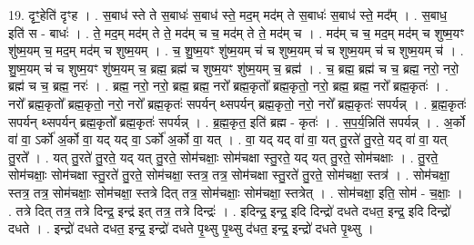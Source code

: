 \documentclass[17pt]{extarticle}
\begin{document}
19. दृꣳ॒॒हेति॑ दृꣳह । . स॒बाध॑ स्ते ते स॒बाधः॑ स॒बाध॑ स्ते॒ मद॒म् मद॑म् ते स॒बाधः॑ स॒बाध॑ स्ते॒ मद᳚म् । . स॒बाध॒ इति॑ स - बाधः॑ । . ते॒ मद॒म् मद॑म् ते ते॒ मद॑म् च च॒ मद॑म् ते ते॒ मद॑म् च । . मद॑म् च च॒ मद॒म् मद॑म् च शुष्म॒यꣳ शु॑ष्म॒यम् च॒ मद॒म् मद॑म् च शुष्म॒यम् । . च॒ शु॒ष्म॒यꣳ शु॑ष्म॒यम् च॑ च शुष्म॒यम् च॑ च शुष्म॒यम् च॑ च शुष्म॒यम् च॑ । . शु॒ष्म॒यम् च॑ च शुष्म॒यꣳ शु॑ष्म॒यम् च॒ ब्रह्म॒ ब्रह्म॑ च शुष्म॒यꣳ शु॑ष्म॒यम् च॒ ब्रह्म॑ । . च॒ ब्रह्म॒ ब्रह्म॑ च च॒ ब्रह्म॒ नरो॒ नरो॒ ब्रह्म॑ च च॒ ब्रह्म॒ नरः॑ । . ब्रह्म॒ नरो॒ नरो॒ ब्रह्म॒ ब्रह्म॒ नरो᳚ ब्रह्म॒कृतो᳚ ब्रह्म॒कृतो॒ नरो॒ ब्रह्म॒ ब्रह्म॒ नरो᳚ ब्रह्म॒कृतः॑ । . नरो᳚ ब्रह्म॒कृतो᳚ ब्रह्म॒कृतो॒ नरो॒ नरो᳚ ब्रह्म॒कृतः॑ सपर्यन् थ्सपर्यन् ब्रह्म॒कृतो॒ नरो॒ नरो᳚ ब्रह्म॒कृतः॑ सपर्यन्न् । . ब्र॒ह्म॒कृतः॑ सपर्यन् थ्सपर्यन् ब्रह्म॒कृतो᳚ ब्रह्म॒कृतः॑ सपर्यन्न् । . ब्र॒ह्म॒कृत॒ इति॑ ब्रह्म - कृतः॑ । . स॒प॒र्य॒न्निति॑ सपर्यन्न् । . अ॒र्को वा॑ वा॒ ऽर्को॑ अ॒र्को वा॒ यद् यद् वा॒ ऽर्को॑ अ॒र्को वा॒ यत् । . वा॒ यद् यद् वा॑ वा॒ यत् तु॒रते॑ तु॒रते॒ यद् वा॑ वा॒ यत् तु॒रते᳚ । . यत् तु॒रते॑ तु॒रते॒ यद् यत् तु॒रते॒ सोम॑चक्षाः॒ सोम॑चक्षा स्तु॒रते॒ यद् यत् तु॒रते॒ सोम॑चक्षाः । . तु॒रते॒ सोम॑चक्षाः॒ सोम॑चक्षा स्तु॒रते॑ तु॒रते॒ सोम॑चक्षा॒ स्तत्र॒ तत्र॒ सोम॑चक्षा स्तु॒रते॑ तु॒रते॒ सोम॑चक्षा॒ स्तत्र॑ । . सोम॑चक्षा॒ स्तत्र॒ तत्र॒ सोम॑चक्षाः॒ सोम॑चक्षा॒ स्तत्रे दित् तत्र॒ सोम॑चक्षाः॒ सोम॑चक्षा॒ स्तत्रेत् । . सोम॑चक्षा॒ इति॒ सोम॑ - च॒क्षाः॒ । . तत्रे दित् तत्र॒ तत्रे दिन्द्र॒ इन्द्र॑ इत् तत्र॒ तत्रे दिन्द्रः॑ । . इदिन्द्र॒ इन्द्र॒ इदि दिन्द्रो॑ दधते दधत॒ इन्द्र॒ इदि दिन्द्रो॑ दधते । . इन्द्रो॑ दधते दधत॒ इन्द्र॒ इन्द्रो॑ दधते पृ॒थ्सु पृ॒थ्सु द॑धत॒ इन्द्र॒ इन्द्रो॑ दधते पृ॒थ्सु । \newline
\end{document}
